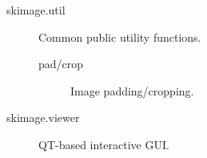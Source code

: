 \documentclass[nohyper, %
               ]{tufte-handout}
\begin{document}
\begin{description}
\begin{description}
    \end{description}
    \item[skimage.util] Common public utility functions.
    \begin{description}
      \item[pad/crop] Image padding/cropping.
    \end{description}
    \item[skimage.viewer] QT-based interactive GUI.
  \end{description}

\newpage


\end{document}
